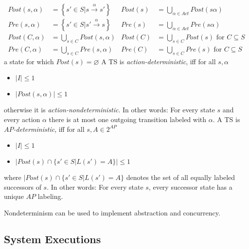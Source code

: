 \documentclass[a4paper, 10pt]{article}
\begin{document}
\begin{mdframed}[roundcorner=5pt,
subtitlebelowline=false,subtitleaboveline=false,
subtitlebackgroundcolor=blue!30,
frametitlerule=true,
frametitlebackgroundcolor=blue!30,
frametitle={Predecessors and Successors}
]
\begin{align*}
Post(s,\alpha)&= \left\{ s'\in S | s\overset{\alpha}{\longrightarrow}s' \right\} &
Post(s) &= \bigcup_{\alpha\in Act} Post(s\alpha)
\\
Pre(s,\alpha)&= \left\{ s'\in S | s'\overset{\alpha}{\longrightarrow}s \right\} &
Pre(s) &= \bigcup_{\alpha\in Act} Pre(s\alpha)
\\
Post(C,\alpha) &= \bigcup_{s\in C} Post(s,\alpha) &
Post(C) &= \bigcup_{s\in C} Post(s) \text{ for } C\subseteq S
\\
Pre(C,\alpha) &= \bigcup_{s\in C} Pre(s,\alpha) &
Pre(C) &= \bigcup_{s\in C} Pre(s) \text{ for } C\subseteq S
\end{align*}
a state for which $Post(s)=\varnothing$
A TS is \emph{action-deterministic}, iff for all $s,\alpha$
\begin{itemize}
    \item $|I|\leq 1$
    \item $|Post(s,\alpha)|\leq 1$
\end{itemize}
otherwise it is \emph{action-nondeterministic}. In other words: For every state $s$ and every action $\alpha$ there is at most one outgoing transition labeled with $\alpha$.
A TS is \emph{$AP$-deterministic}, iff for all $s,A\in 2^{AP}$
\begin{itemize}
    \item $|I|\leq 1$
    \item $|Post(s)\cap\{ s'\in S | L(s')=A \} | \leq 1$
\end{itemize}
where $|Post(s)\cap\{ s'\in S | L(s')=A \}$ denotes the set of all equally labeled successors of $s$. In other words: For every state $s$, every successor state has a unique $AP$ labeling.
\end{mdframed}

Nondeterminism can be used to implement abstraction and concurrency.

\subsection{System Executions}
\end{document}
